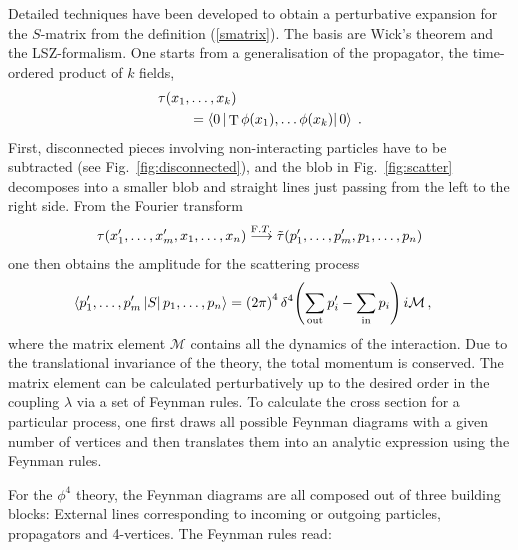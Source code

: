 \documentclass[12pt]{report}
\newcommand{\braopket}[3]{\ensuremath{\left\langle#1\left|\vphantom{#1 #3} #2\right|#3 \right\rangle}}
\DeclareMathOperator{\T}{T}
\newcommand{\2}{\ensuremath{\sqrt{2}\,}}
\begin{document}
{        Detailed techniques have been developed to obtain a perturbative expansion for the $S$-matrix
        from the definition (\ref{smatrix}). The basis are Wick's theorem and the LSZ-formalism. One
        starts from a generalisation of the propagator, the time-ordered product of $k$ fields,
        \begin{align}
          \begin{split}
            \tau(x_1,&\ldots,x_k) \\
            &=  \braopket{0}{\T \phi(x_1),\ldots \phi(x_k)}{0}\;.
          \end{split}
        \end{align}
        First, disconnected pieces involving non-interacting particles have to be subtracted
        (see Fig.~\ref{fig:disconnected}), 
        and the blob in Fig.~\ref{fig:scatter} decomposes into a smaller blob and
        straight lines just passing from the left to the right side.
        From the Fourier transform
        \begin{align}
        \tau(x_1',\ldots, x_m',x_1, \ldots, x_n) \stackrel{\text F.T.}{\longrightarrow} 
        \tilde{\tau}(p_1',\ldots,p_m',p_1,\ldots,p_n)
        \end{align}
        one then obtains the amplitude for the scattering process 
        \begin{align}
          \braopket{p_1',\ldots,p_m'}{S}{p_1,\ldots,p_n} &= \left(2\pi\right)^4
          \delta^4\!\left(\sum_\text{out} p_i'-\sum_\text{in} p_i\right) i\mathcal{M}\,,
        \end{align}
        where the matrix element $\mathcal{M}$ contains all the dynamics of the interaction. Due to
        the translational invariance of the theory, the total momentum is conserved. The matrix
        element can be calculated perturbatively up to the desired order in the coupling $\lambda$ via
        a set of Feynman rules. To calculate the cross section for a particular process, one first
        draws all possible  Feynman diagrams with a given number of vertices and then translates
        them into an analytic expression using the Feynman rules. 

        For the $\phi^4$ theory, the Feynman diagrams are all composed out of three building blocks:
        External lines corresponding to incoming or outgoing particles, propagators and
        4-vertices. The Feynman rules read: 
        
}
\end{document}
